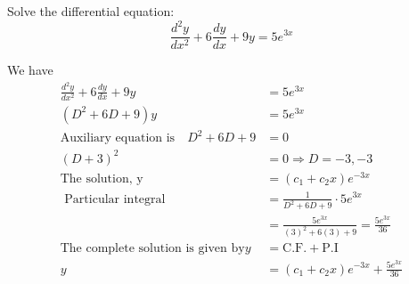 \begin{exercise}
	Solve the differential equation:
	$$
	\frac{d^{2} y}{d x^{2}}+6 \frac{d y}{d x}+9 y=5 e^{3 x}
	$$
\end{exercise}
\begin{answer}
	We have
	\begin{align*}
	\frac{d^{2} y}{d x^{2}}+6 \frac{d y}{d x}+9 y&=5 e^{3 x} \\
	 \left(D^{2}+6 D+9\right) y&=5 e^{3 x}\\
	\text{Auxiliary equation is}\quad D^{2}+6 D+9&=0\\
(D+3)^{2}&=0 \Rightarrow D=-3,-3\\
	\text{The solution, y}&=\left(c_{1}+c_{2} x\right) e^{-3 x}\\
	\text { Particular integral } &=\frac{1}{D^{2}+6 D+9} \cdot 5 e^{3 x} \\
	&=\frac{5 e^{3 x}}{(3)^{2}+6(3)+9}=\frac{5 e^{3 x}}{36}\\
	\text{The complete solution is given by} y&=\mathrm{C} . \mathrm{F} .+\mathrm{P} . \mathrm{I}\\
 y&=\left(c_{1}+c_{2} x\right) e^{-3 x}+\frac{5 e^{3 x}}{36}
	\end{align*}
\end{answer}
